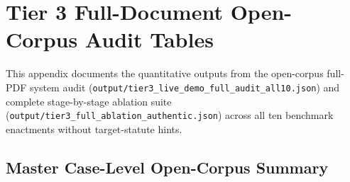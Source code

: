 \chapter[Tier 3 Open-Corpus Audit Results]{Tier 3 Full-Document Open-Corpus Audit Tables}
\label{app:tier3_full_results}

This appendix documents the quantitative outputs from the open-corpus full-PDF system audit (\texttt{output/tier3\_live\_demo\_full\_audit\_all10.json}) and complete stage-by-stage ablation suite (\texttt{output/tier3\_full\_ablation\_authentic.json}) across all ten benchmark enactments without target-statute hints.

\section{Master Case-Level Open-Corpus Summary}
\label{sec:app_tier3_summary_table}

